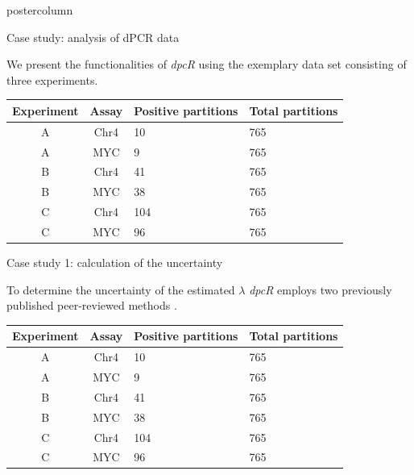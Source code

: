\documentclass[final]{beamer}\usepackage[]{graphicx}\usepackage[]{color}
\newlength{\columnheight}
\begin{document}
\begin{frame}
\begin{columns}
    
    
    \begin{column}{.54\textwidth}
      \begin{beamercolorbox}[center,wd=\textwidth]{postercolumn}
        \begin{minipage}[T]{.95\textwidth}  
          \parbox[t][\columnheight]{\textwidth}
            {
    
    \begin{block}{Case study: analysis of dPCR data}

We present the functionalities of \textit{dpcR} using the exemplary data set consisting of three experiments.

\begin{table}[ht]
\centering
\begin{tabular}{ccll}
  \toprule
Experiment & Assay & Positive partitions & Total partitions \\ 
  \midrule
A & Chr4 & 10 & 765 \\ 
   \rowcolor{white}A & MYC & 9 & 765 \\ 
  B & Chr4 & 41 & 765 \\ 
   \rowcolor{white}B & MYC & 38 & 765 \\ 
  C & Chr4 & 104 & 765 \\ 
   \rowcolor{white}C & MYC & 96 & 765 \\ 
   \bottomrule
\end{tabular}
\end{table}


    \end{block}
    \vfill
    
    \begin{block}{Case study 1: calculation of the uncertainty}

To determine the uncertainty of the estimated $\lambda$ \textit{dpcR} employs two previously 
published peer-reviewed methods \cite{dube_mathematical_2008, bhat_single_2009}.

\begin{table}[ht]
\centering
\begin{tabular}{ccll}
  \toprule
Experiment & Assay & Positive partitions & Total partitions \\ 
  \midrule
A & Chr4 & 10 & 765 \\ 
   \rowcolor{white}A & MYC & 9 & 765 \\ 
  B & Chr4 & 41 & 765 \\ 
   \rowcolor{white}B & MYC & 38 & 765 \\ 
  C & Chr4 & 104 & 765 \\ 
   \rowcolor{white}C & MYC & 96 & 765 \\ 
   \bottomrule
\end{tabular}
\end{table}



\end{block}}
\end{minipage}
\end{beamercolorbox}
\end{column}
\end{columns}
\end{frame}
\end{document}
